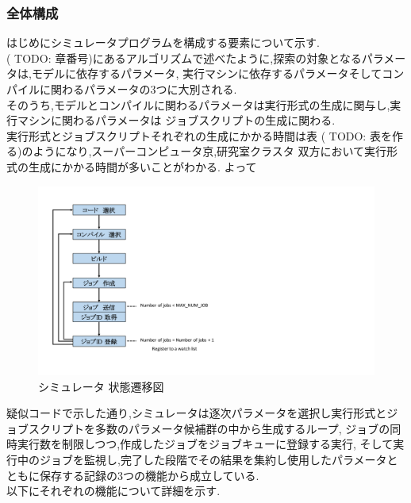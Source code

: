 \subsubsection{全体構成}
はじめにシミュレータプログラムを構成する要素について示す.\\
( TODO: 章番号)にあるアルゴリズムで述べたように,探索の対象となるパラメータは,モデルに依存するパラメータ,
実行マシンに依存するパラメータそしてコンパイルに関わるパラメータの3つに大別される.\\
そのうち,モデルとコンパイルに関わるパラメータは実行形式の生成に関与し,実行マシンに関わるパラメータは
ジョブスクリプトの生成に関わる.\\
実行形式とジョブスクリプトそれぞれの生成にかかる時間は表 ( TODO: 表を作る)のようになり,スーパーコンピュータ京,研究室クラスタ
双方において実行形式の生成にかかる時間が多いことがわかる. よって\\
\begin{figure}[htb]
  \begin{center}
    \includegraphics[width=20.0cm]{./images/state.pdf}
    \caption{シミュレータ 状態遷移図}
    \label{fig:test}
  \end{center}
\end{figure}
{\footnotesize

}
疑似コードで示した通り,シミュレータは逐次パラメータを選択し実行形式とジョブスクリプトを多数のパラメータ候補群の中から生成するループ,
ジョブの同時実行数を制限しつつ,作成したジョブをジョブキューに登録する実行,
そして実行中のジョブを監視し,完了した段階でその結果を集約し使用したパラメータとともに保存する記録の3つの機能から成立している.\\
以下にそれぞれの機能について詳細を示す.\\
